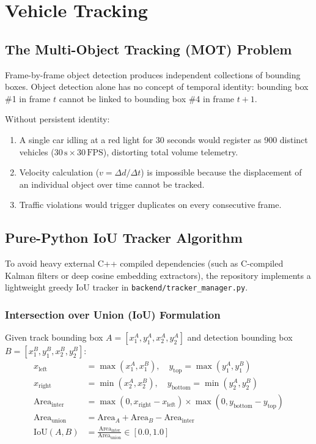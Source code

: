 \chapter{Vehicle Tracking}

\section{The Multi-Object Tracking (MOT) Problem}
Frame-by-frame object detection produces independent collections of bounding boxes. Object detection alone has no concept of temporal identity: bounding box \#1 in frame $t$ cannot be linked to bounding box \#4 in frame $t+1$.

Without persistent identity:
\begin{enumerate}
    \item A single car idling at a red light for 30 seconds would register as 900 distinct vehicles ($30\,\text{s} \times 30\,\text{FPS}$), distorting total volume telemetry.
    \item Velocity calculation ($v = \Delta d / \Delta t$) is impossible because the displacement of an individual object over time cannot be tracked.
    \item Traffic violations would trigger duplicates on every consecutive frame.
\end{enumerate}

\section{Pure-Python IoU Tracker Algorithm}
To avoid heavy external C++ compiled dependencies (such as C-compiled Kalman filters or deep cosine embedding extractors), the repository implements a lightweight greedy IoU tracker in \texttt{backend/tracker\_manager.py}.

\subsection{Intersection over Union (IoU) Formulation}
Given track bounding box $A = [x_1^A, y_1^A, x_2^A, y_2^A]$ and detection bounding box $B = [x_1^B, y_1^B, x_2^B, y_2^B]$:
\begin{align}
x_{\text{left}} &= \max(x_1^A, x_1^B), \quad y_{\text{top}} = \max(y_1^A, y_1^B) \\
x_{\text{right}} &= \min(x_2^A, x_2^B), \quad y_{\text{bottom}} = \min(y_2^A, y_2^B) \\
\text{Area}_{\text{inter}} &= \max(0, x_{\text{right}} - x_{\text{left}}) \times \max(0, y_{\text{bottom}} - y_{\text{top}}) \\
\text{Area}_{\text{union}} &= \text{Area}_A + \text{Area}_B - \text{Area}_{\text{inter}} \\
\text{IoU}(A, B) &= \frac{\text{Area}_{\text{inter}}}{\text{Area}_{\text{union}}} \in [0.0, 1.0]
\end{align}

